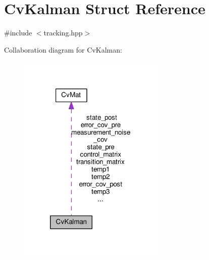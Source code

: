 \hypertarget{structCvKalman}{\section{Cv\-Kalman Struct Reference}
\label{structCvKalman}
}


{\ttfamily \#include $<$tracking.\-hpp$>$}



Collaboration diagram for Cv\-Kalman\-:\nopagebreak
\begin{figure}[H]
\begin{center}
\leavevmode
\includegraphics[width=198pt]{structCvKalman__coll__graph}
\end{center}
\end{figure}
